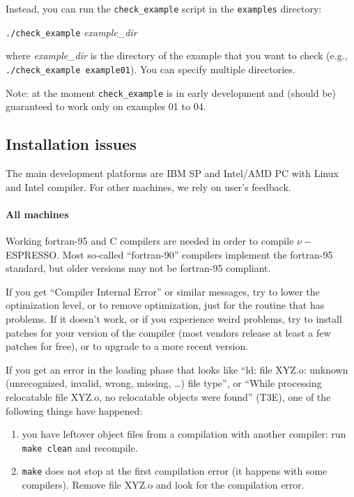 \documentclass[12pt,a4paper]{article}
\begin{document}
\begin{enumerate}
Instead, you can run the \texttt{check\_example} script in the
\texttt{examples} directory:
\medskip

\quad\texttt{./check\_example} \emph{example\_dir}
\medskip

\noindent
where \emph{example\_dir} is the directory of the example that you
want to check (e.g., \texttt{./check\_example example01}).
You can specify multiple directories.

Note: at the moment \texttt{check\_example} is in early development
and (should be) guaranteed to work only on examples 01 to 04.
\end{enumerate}

\subsection{Installation issues}
  \label{installissues}

The main development platforms are IBM SP and Intel/AMD PC with Linux
and Intel compiler.  For other machines, we rely on user's feedback.

\paragraph{All machines}

Working fortran-95 and C compilers are needed in order to compile 
$\nu-$ESPRESSO. Most so-called ``fortran-90'' compilers implement the 
fortran-95 standard, but older versions may not be fortran-95
compliant.

If you get ``Compiler Internal Error'' or similar messages, try to
lower the optimization level, or to remove optimization, just for the
routine that has problems.  If it doesn't work, or if you experience
weird problems, try to install patches for your version of the
compiler (most vendors release at least a few patches for free), or to
upgrade to a more recent version.

If you get an error in the loading phase that looks like ``ld: file
XYZ.o: unknown (unrecognized, invalid, wrong, missing, \dots) file
type'', or ``While processing relocatable file XYZ.o, no relocatable
objects were found'' (T3E), one of the following things have happened:

\begin{enumerate}
  \item you have leftover object files from a compilation with another 
        compiler: run \texttt{make clean} and recompile.
  \item \texttt{make} does not stop at the first compilation error (it
        happens with some compilers).
        Remove file XYZ.o and look for the compilation error.
\end{enumerate}
\end{document}
